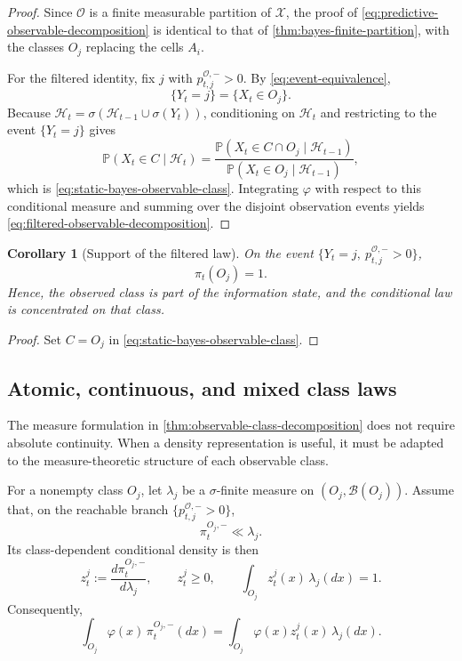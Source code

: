 \documentclass[10pt,twocolumn]{article}
\newtheorem{corollary}{Corollary}
\theoremstyle{remark}
\newcommand{\Pp}{\mathbb{P}}
\newcommand{\B}{\mathcal{B}}
\newcommand{\Hh}{\mathcal{H}}
\newcommand{\Oo}{\mathcal{O}}
\newcommand{\Xcal}{\mathcal{X}}
\begin{document}
\begin{proof}
	Since $\Oo$ is a finite measurable partition of $\Xcal$, the proof of \cref{eq:predictive-observable-decomposition} is identical to that of \cref{thm:bayes-finite-partition}, with the classes $O_j$ replacing the cells $A_i$.
	
	For the filtered identity, fix $j$ with $p_{t,j}^{\Oo,-}>0$. By \cref{eq:event-equivalence},
	\[
	\{Y_t=j\}=\{X_t\in O_j\}.
	\]
	Because $\Hh_t=\sigma(\Hh_{t-1} \cup \sigma(Y_t))$, conditioning on $\Hh_t$ and restricting to the event $\{Y_t=j\}$ gives
	\[
	\Pp(X_t\in C\mid\Hh_t)
	=
	\frac{\Pp(X_t\in C\cap O_j\mid\Hh_{t-1})}
	{\Pp(X_t\in O_j\mid\Hh_{t-1})},
	\]
	which is \cref{eq:static-bayes-observable-class}. Integrating $\varphi$ with respect to this conditional measure and summing over the disjoint observation events yields \cref{eq:filtered-observable-decomposition}.
\end{proof}

\begin{corollary}[Support of the filtered law]
	\label{cor:filtered-support}
	On the event $\{Y_t=j,\ p_{t,j}^{\Oo,-}>0\}$,
	\begin{equation*}
		\pi_t(O_j)=1.
		\label{eq:filtered-support-class}
	\end{equation*}
	Hence, the observed class is part of the information state, and the conditional law is concentrated on that class.
\end{corollary}

\begin{proof}
	Set $C=O_j$ in \cref{eq:static-bayes-observable-class}.
\end{proof}

\subsection{Atomic, continuous, and mixed class laws}
\label{subsec:atomic-continuous-mixed}

The measure formulation in \cref{thm:observable-class-decomposition} does not require absolute continuity. When a density representation is useful, it must be adapted to the measure-theoretic structure of each observable class.

For a nonempty class $O_j$, let $\lambda_j$ be a $\sigma$-finite measure on $(O_j,\B(O_j))$. Assume that, on the reachable branch $\{p_{t,j}^{\Oo,-}>0\}$,
\begin{equation*}
	\pi_t^{O_j,-}\ll\lambda_j.
	\label{eq:class-absolute-continuity}
\end{equation*}
Its class-dependent conditional density is then
\begin{equation}
	z_t^j
	:=
	\frac{d\pi_t^{O_j,-}}{d\lambda_j},
	\qquad
	z_t^j\geq 0,
	\qquad
	\int_{O_j}z_t^j(x)\,\lambda_j(dx)=1.
	\label{eq:class-conditional-density}
\end{equation}
Consequently,
\begin{equation*}
	\int_{O_j}\varphi(x)\,\pi_t^{O_j,-}(dx)
	=
	\int_{O_j}\varphi(x)z_t^j(x)\,\lambda_j(dx).
	\label{eq:class-density-expectation}
\end{equation*}
\end{document}
